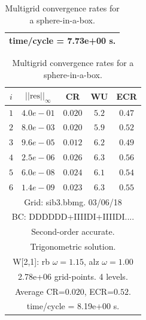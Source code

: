 \begin{table}[hbt]
\begin{center}
{\begin{tabular}{|c|c|c|c|c|}
\multicolumn{5}{|c|}{time/cycle = 7.73e+00 s.}  \\
\hline 
\end{tabular}
\begin{tabular}{|c|c|c|c|c|} \hline 
 $i$   & $\vert\vert\mbox{res}\vert\vert_\infty$  &  CR     &  WU    & ECR  \\   \hline 
 $ 1$  & $ 4.0e-01$ & $0.020$ & $ 5.2$ & $0.47$ \\ 
 $ 2$  & $ 8.0e-03$ & $0.020$ & $ 5.9$ & $0.52$ \\ 
 $ 3$  & $ 9.6e-05$ & $0.012$ & $ 6.2$ & $0.49$ \\ 
 $ 4$  & $ 2.5e-06$ & $0.026$ & $ 6.3$ & $0.56$ \\ 
 $ 5$  & $ 6.0e-08$ & $0.024$ & $ 6.1$ & $0.54$ \\ 
 $ 6$  & $ 1.4e-09$ & $0.023$ & $ 6.3$ & $0.55$ \\ 
\hline 
\multicolumn{5}{|c|}{Grid: sib3.bbmg. 03/06/18}  \\
\multicolumn{5}{|c|}{BC: DDDDDD+IIIIDI+IIIIDI....}  \\
\multicolumn{5}{|c|}{Second-order accurate.}  \\
\multicolumn{5}{|c|}{Trigonometric solution.}  \\
\multicolumn{5}{|c|}{W[2,1]: rb $\omega=1.15$, alz $\omega=1.00$}  \\
\multicolumn{5}{|c|}{2.78e+06 grid-points. 4 levels.}  \\
\multicolumn{5}{|c|}{Average CR=$0.020$, ECR=$0.52$.}  \\
\multicolumn{5}{|c|}{time/cycle = 8.19e+00 s.}  \\
\hline 
\end{tabular}
} %
\end{center}
\caption{Multigrid convergence rates for a sphere-in-a-box.}
\label{fig:sibI}
\end{table}



